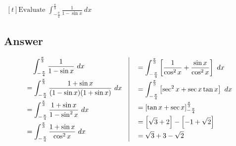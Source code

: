 \documentclass[17pt]{extarticle}
\begin{document}
\begin{fleqn}
$\begin{aligned}[t] 
\text{Evaluate \ } \int_{-\frac{\pi}{4}}^{\frac{\pi}{3}} \frac{1}{1 - \sin x}\ dx
\end{aligned}$

\subsection*{Answer}
\begin{equation} \nonumber
\begin{alignedat}{4}
& \quad  \int_{-\frac{\pi}{4}}^{\frac{\pi}{3}} \frac{1}{1 - \sin x}\ dx\\
&= \int_{-\frac{\pi}{4}}^{\frac{\pi}{3}} \frac{1+\sin x}{(1 - \sin x)(1 + \sin x)}\ dx\\
&= \int_{-\frac{\pi}{4}}^{\frac{\pi}{3}} \frac{1+\sin x}{1 - \sin^2x}\ dx\\
&= \int_{-\frac{\pi}{4}}^{\frac{\pi}{3}} \frac{1+\sin x}{\cos^2x}\ dx\\
\end{alignedat}
\quad
\vrule
\quad
\begin{alignedat}{4}
&= \int_{-\frac{\pi}{4}}^{\frac{\pi}{3}} \left[\frac{1}{\cos^2x} + \frac{\sin x}{\cos^2x}\right] \ dx\\
&= \int_{-\frac{\pi}{4}}^{\frac{\pi}{3}} \left[\sec^2x + \sec x \tan x \right] \ dx\\
&= \left[\tan x + \sec x \right]_{-\frac{\pi}{4}}^{\frac{\pi}{3}}\\
&= \left[ \sqrt{3}+2\right] - \left[-1 + \sqrt{2}\right]\\
&= \sqrt{3}+3 - \sqrt{2} \\
\end{alignedat}
\end{equation}


\end{fleqn}
\end{document}
